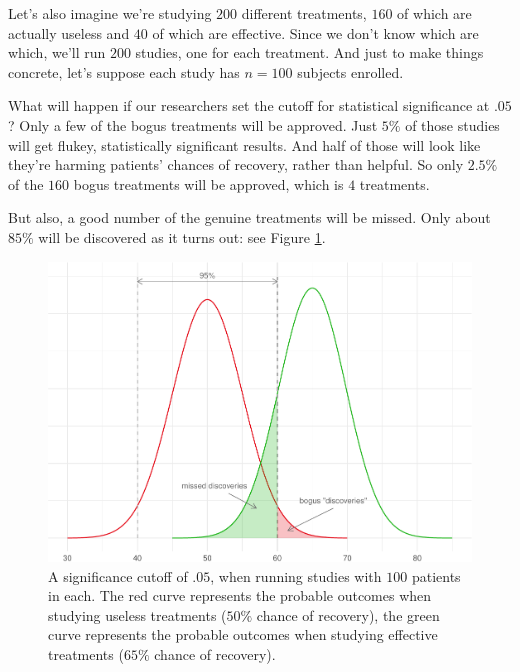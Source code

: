 \documentclass[justified]{tufte-book}
\theoremstyle{definition}
\theoremstyle{definition}
\theoremstyle{definition}
\theoremstyle{remark}
\begin{document}
Let's also imagine we're studying \(200\) different treatments, \(160\)
of which are actually useless and \(40\) of which are effective. Since
we don't know which are which, we'll run \(200\) studies, one for each
treatment. And just to make things concrete, let's suppose each study
has \(n = 100\) subjects enrolled.

What will happen if our researchers set the cutoff for statistical
significance at \(.05\)? Only a few of the bogus treatments will be
approved. Just \(5\%\) of those studies will get flukey, statistically
significant results. And half of those will look like they're harming
patients' chances of recovery, rather than helpful. So only \(2.5\%\) of
the \(160\) bogus treatments will be approved, which is \(4\)
treatments.

But also, a good number of the genuine treatments will be missed. Only
about \(85\%\) will be discovered as it turns out: see Figure
\ref{fig:hundredstudies}.

\begin{figure}
\includegraphics{_main_files/figure-latex/hundredstudies-1} \caption[A significance cutoff of $.05$, when running studies with $100$ patients in each]{A significance cutoff of $.05$, when running studies with $100$ patients in each. The red curve represents the probable outcomes when studying useless treatments ($50\%$ chance of recovery), the green curve represents the probable outcomes when studying effective treatments ($65\%$ chance of recovery).}\label{fig:hundredstudies}
\end{figure}
\end{document}
